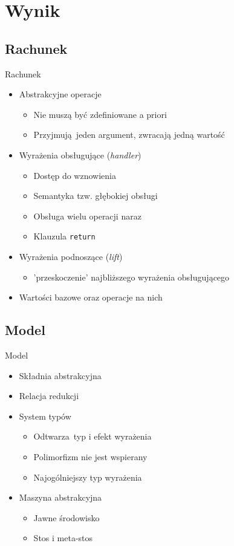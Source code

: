 \documentclass{beamer}
\begin{document}
\section{Wynik}

\subsection{Rachunek}
\begin{frame}{Rachunek}
  \begin{itemize}
    \item Abstrakcyjne operacje
    \begin{itemize}
      \item Nie muszą być zdefiniowane a priori
      \item Przyjmują jeden argument, zwracają jedną wartość
    \end{itemize}
    \item Wyrażenia obsługujące (\emph{handler})
    \begin{itemize}
      \item Dostęp do wznowienia
      \item Semantyka tzw. głębokiej obsługi
      \item Obsługa wielu operacji naraz
      \item Klauzula \texttt{return}
    \end{itemize}
    \item Wyrażenia podnoszące (\emph{lift})
    \begin{itemize}
      \item 'przeskoczenie' najbliższego wyrażenia obsługującego
    \end{itemize}
    \item Wartości bazowe oraz operacje na nich
  \end{itemize}
\end{frame}


\subsection{Model}
\begin{frame}{Model}
  \begin{itemize}
    \item Składnia abstrakcyjna
    \item Relacja redukcji
    \item System typów
    \begin{itemize}
      \item Odtwarza typ i efekt wyrażenia
      \item Polimorfizm nie jest wspierany
      \item Najogólniejszy typ wyrażenia
    \end{itemize}
    \item Maszyna abstrakcyjna
    \begin{itemize}
      \item Jawne środowisko
      \item Stos i meta-stos
    \end{itemize}
  \end{itemize}
\end{frame}
\end{document}
